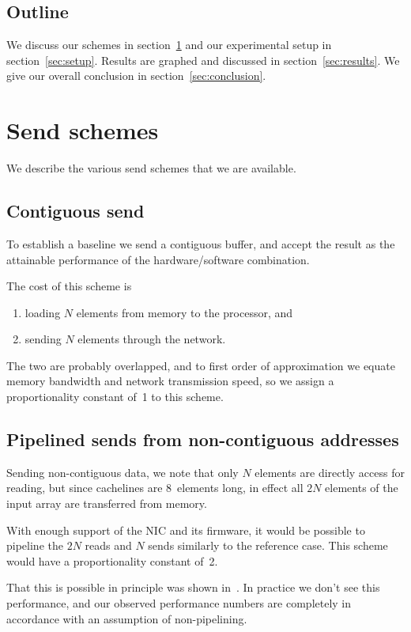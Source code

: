\subsection{Outline}

We discuss our schemes in section~\ref{sec:schemes} and our
experimental setup in section~\ref{sec:setup}. Results are graphed and
discussed in section~\ref{sec:results}. We give our overall conclusion
in section~\ref{sec:conclusion}.

\section{Send schemes}
\label{sec:schemes}

We describe the various send schemes that we are available. 

\subsection{Contiguous send}

To establish a baseline we send a contiguous buffer, and accept the
result as the attainable performance of the hardware/software
combination.

The cost of this scheme is
\begin{enumerate}
\item loading $N$ elements from memory to the processor, and
\item sending $N$ elements through the network.
\end{enumerate}
The two are probably overlapped, and to first order of approximation
we equate memory bandwidth and network transmission speed, so we
assign a proportionality constant of~1 to this scheme.

\subsection{Pipelined sends from non-contiguous addresses}

Sending non-contiguous data,
we note that
only $N$ elements are directly access for reading, but
since cachelines are 8~elements long, in effect all $2N$ elements
of the input array are transferred from memory.

With enough support of the \ac{NIC} and its firmware, it
would be possible to pipeline the $2N$ reads and $N$ sends
similarly to the reference case. This scheme would have a proportionality constant of~2.

That this is possible in principle was shown in~\cite{LI:MpiDataUMR}.
In practice we don't see this performance,
and our observed performance numbers are
completely in accordance with an assumption of non-pipelining.

